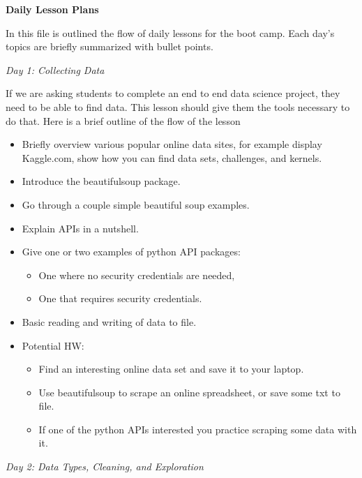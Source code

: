 \documentclass[12pt]{article}
\begin{document}
	\noindent
	\textbf{\Large{Daily Lesson Plans}}
	
	\vspace{4mm}
	\noindent
	In this file is outlined the flow of daily lessons for the boot camp. Each day's topics are briefly summarized with bullet points.
	
	
	\vspace{4mm}
	\noindent
	\textit{\large{Day 1: Collecting Data}}
	
	\noindent
	If we are asking students to complete an end to end data science project, they need to be able to find data. This lesson should give them the tools necessary to do that. Here is a brief outline of the flow of the lesson
	\begin{itemize}
		\item Briefly overview various popular online data sites, for example display Kaggle.com, show how you can find data sets, challenges, and kernels.
		\item Introduce the beautifulsoup package.
		\item Go through a couple simple beautiful soup examples.
		\item Explain APIs in a nutshell.
		\item Give one or two examples of python API packages:
			\begin{itemize}
				\item One where no security credentials are needed,
				\item One that requires security credentials.
			\end{itemize}
		\item Basic reading and writing of data to file.
		\item Potential HW:
			\begin{itemize}
				\item Find an interesting online data set and save it to your laptop.
				\item Use beautifulsoup to scrape an online spreadsheet, or save some txt to file.
				\item If one of the python APIs interested you practice scraping some data with it.
			\end{itemize}
	\end{itemize}
	
	
	
	\vspace{2mm}
	\noindent
	\textit{\large{Day 2: Data Types, Cleaning, and Exploration}}
	
\end{document}
